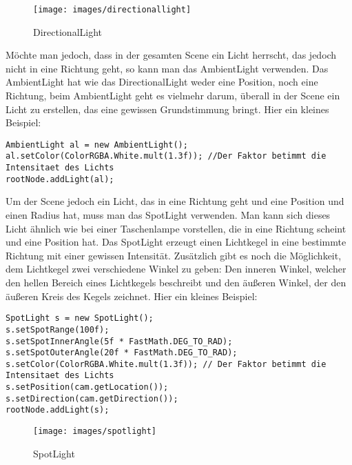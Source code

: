 \begin{figure}[h!]
	
	
	\caption{DirectionalLight}
	
	\centering\texttt{[image: images/directionallight]} 
	
\end{figure}

\newpage

Möchte man jedoch, dass in der gesamten Scene ein Licht herrscht, das jedoch nicht in eine Richtung geht, so kann man das AmbientLight verwenden. Das AmbientLight hat wie das DirectionalLight weder eine Position, noch eine Richtung, beim AmbientLight geht es vielmehr darum, überall in der Scene ein Licht zu erstellen, das eine gewissen Grundstimmung bringt. Hier ein kleines Beispiel:

\begin{lstlisting}
AmbientLight al = new AmbientLight();
al.setColor(ColorRGBA.White.mult(1.3f)); //Der Faktor betimmt die Intensitaet des Lichts  
rootNode.addLight(al);
\end{lstlisting}

Um der Scene jedoch ein Licht, das in eine Richtung geht und eine Position und einen Radius hat, muss man das SpotLight verwenden. Man kann sich dieses Licht ähnlich wie bei einer Taschenlampe vorstellen, die in eine Richtung scheint und eine Position hat. Das SpotLight erzeugt einen Lichtkegel in eine bestimmte Richtung mit einer gewissen Intensität. Zusätzlich gibt es noch die Möglichkeit, dem Lichtkegel zwei verschiedene Winkel zu geben: Den inneren Winkel, welcher den hellen Bereich eines Lichtkegels beschreibt und den äußeren Winkel, der den äußeren Kreis des Kegels zeichnet. Hier ein kleines Beispiel:
\begin{lstlisting}
SpotLight s = new SpotLight();
s.setSpotRange(100f);                           
s.setSpotInnerAngle(5f * FastMath.DEG_TO_RAD); 
s.setSpotOuterAngle(20f * FastMath.DEG_TO_RAD); 
s.setColor(ColorRGBA.White.mult(1.3f)); // Der Faktor betimmt die Intensitaet des Lichts         
s.setPosition(cam.getLocation());         
s.setDirection(cam.getDirection());     
rootNode.addLight(s);
\end{lstlisting}

\begin{figure}[h!]
	
	
	\caption{SpotLight}
	
	\centering\texttt{[image: images/spotlight]} 
	
\end{figure}

